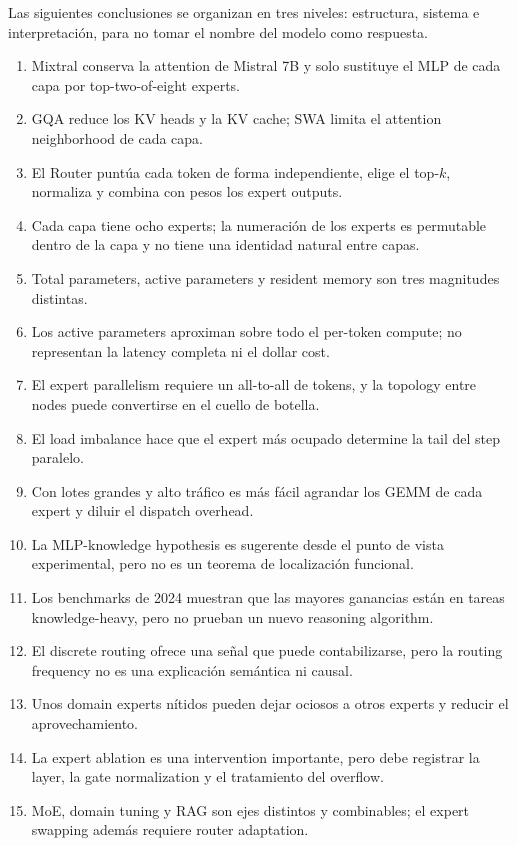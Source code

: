 \documentclass[a4paper]{article}
\begin{document}
Las siguientes conclusiones se organizan en tres niveles: estructura, sistema e interpretación, para no tomar el nombre del modelo como respuesta.

\begin{enumerate}
  \item Mixtral conserva la attention de Mistral 7B y solo sustituye el MLP de cada capa por top-two-of-eight experts.
  \item GQA reduce los KV heads y la KV cache; SWA limita el attention neighborhood de cada capa.
  \item El Router puntúa cada token de forma independiente, elige el top-$k$, normaliza y combina con pesos los expert outputs.
  \item Cada capa tiene ocho experts; la numeración de los experts es permutable dentro de la capa y no tiene una identidad natural entre capas.
  \item Total parameters, active parameters y resident memory son tres magnitudes distintas.
  \item Los active parameters aproximan sobre todo el per-token compute; no representan la latency completa ni el dollar cost.
  \item El expert parallelism requiere un all-to-all de tokens, y la topology entre nodes puede convertirse en el cuello de botella.
  \item El load imbalance hace que el expert más ocupado determine la tail del step paralelo.
  \item Con lotes grandes y alto tráfico es más fácil agrandar los GEMM de cada expert y diluir el dispatch overhead.
  \item La MLP-knowledge hypothesis es sugerente desde el punto de vista experimental, pero no es un teorema de localización funcional.
  \item Los benchmarks de 2024 muestran que las mayores ganancias están en tareas knowledge-heavy, pero no prueban un nuevo reasoning algorithm.
  \item El discrete routing ofrece una señal que puede contabilizarse, pero la routing frequency no es una explicación semántica ni causal.
  \item Unos domain experts nítidos pueden dejar ociosos a otros experts y reducir el aprovechamiento.
  \item La expert ablation es una intervention importante, pero debe registrar la layer, la gate normalization y el tratamiento del overflow.
  \item MoE, domain tuning y RAG son ejes distintos y combinables; el expert swapping además requiere router adaptation.
\end{enumerate}
\end{document}
